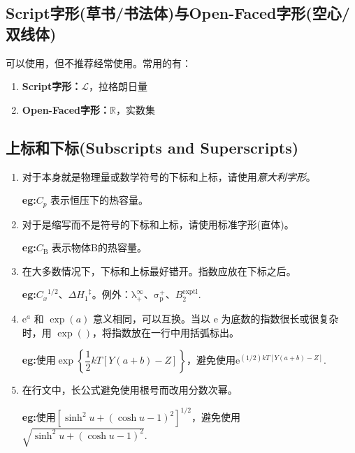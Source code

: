 \subsection{Script字形(草书/书法体)与Open-Faced字形(空心/双线体)}
可以使用，但不推荐经常使用。常用的有：

\begin{enumerate}[label=(\arabic*)]
    \item \textbf{Script字形：}$\mathscr{L}$，拉格朗日量
    \item \textbf{Open-Faced字形：}$\mathbb{R}$，实数集
\end{enumerate}

\subsection{上标和下标(Subscripts and Superscripts)}

\begin{enumerate}[label=(\arabic*),itemsep=5pt]
    \item 对于本身就是物理量或数学符号的下标和上标，请使用\textit{意大利字形}。

            {\textbf{eg:\qquad }$C_p$ 表示恒压下的热容量。}

    \item 对于是缩写而不是符号的下标和上标，请使用标准字形(直体)。

            {\textbf{eg:\qquad }$C_\mathrm{B}$ 表示物体B的热容量。}
 
    \item 在大多数情况下，下标和上标最好错开。指数应放在下标之后。

            {\textbf{eg:\qquad }${C_x}^{1/2}$、$\Delta {H_1}^{\ddagger}$。\qquad 例外：$\mathrm{\lambda}_{+}^\infty$、$\mathrm{\sigma}_\mathrm{p}^+$、$B_2^{\mathrm{exptl}}$.}

    \item $\mathrm{e}^a$ 和 $\exp(a)$ 意义相同，可以互换。当以 $\mathrm{e}$ 为底数的指数很长或很复杂时，用 $\exp()$，将指数放在一行中用括弧标出。

            {\textbf{eg:\qquad }使用$\exp \left\{ \dfrac{1}{2}kT\left[ Y\left( a+b \right) -Z \right] \right\}$，避免使用$\mathrm{e}^{(1/2)kT\left[ Y\left( a+b \right) -Z \right]}.$}

    \item 在行文中，长公式避免使用根号而改用分数次幂。

            {\textbf{eg:\qquad }使用$\left[ \sinh ^2u+\left( \cosh u-1 \right) ^2 \right] ^{1/2}$，避免使用$\sqrt{ \sinh ^2u+\left( \cosh u-1 \right) ^2 }.$}
\end{enumerate}

